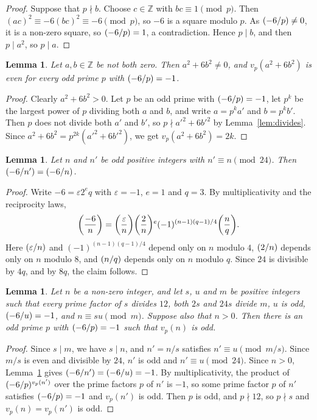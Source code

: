 \documentclass[11pt]{article}
\newtheorem{lemma}[theorem]{Lemma}
\newcommand{\Z}{\mathbb{Z}}
\newcommand{\leg}[2]{\mathchoice{\biggl(\dfrac{#1}{#2}\biggr)}{(#1/#2)}{(#1/#2)}{(#1/#2)}}
\begin{document}
\begin{proof}
Suppose that $p\nmid b$. Choose $c\in\Z$ with $bc\equiv1\pmod p$. Then $(ac)^2\equiv-6(bc)^2\equiv-6\pmod p$, so $-6$ is a square modulo $p$. As $\leg{-6}{p}\neq0$, it is a non-zero square, so $\leg{-6}{p}=1$, a contradiction. Hence $p\mid b$, and then $p\mid a^2$, so $p\mid a$.
\end{proof}

\begin{lemma}\label{lem:even}
Let $a,b\in\Z$ be not both zero. Then $a^2+6b^2\neq0$, and $v_p(a^2+6b^2)$ is even for every odd prime $p$ with $\leg{-6}{p}=-1$.
\end{lemma}

\begin{proof}
Clearly $a^2+6b^2>0$. Let $p$ be an odd prime with $\leg{-6}{p}=-1$, let $p^k$ be the largest power of $p$ dividing both $a$ and $b$, and write $a=p^ka'$ and $b=p^kb'$. Then $p$ does not divide both $a'$ and $b'$, so $p\nmid a'^2+6b'^2$ by Lemma~\ref{lem:divides}. Since $a^2+6b^2=p^{2k}(a'^2+6b'^2)$, we get $v_p(a^2+6b^2)=2k$.
\end{proof}

\begin{lemma}\label{lem:period}
Let $n$ and $n'$ be odd positive integers with $n'\equiv n\pmod{24}$. Then $\leg{-6}{n'}=\leg{-6}{n}$.
\end{lemma}

\begin{proof}
Write $-6=\varepsilon2^eq$ with $\varepsilon=-1$, $e=1$ and $q=3$. By multiplicativity and the reciprocity laws,
\[
\leg{-6}{n}=\leg{\varepsilon}{n}\leg{2}{n}^e(-1)^{(n-1)(q-1)/4}\leg{n}{q}.
\]
Here $\leg{\varepsilon}{n}$ and $(-1)^{(n-1)(q-1)/4}$ depend only on $n$ modulo $4$, $\leg{2}{n}$ depends only on $n$ modulo $8$, and $\leg{n}{q}$ depends only on $n$ modulo $q$. Since $24$ is divisible by $4q$, and by $8q$, the claim follows.
\end{proof}

\begin{lemma}\label{lem:odd}
Let $n$ be a non-zero integer, and let $s$, $u$ and $m$ be positive integers such that every prime factor of $s$ divides $12$, both $2s$ and $24s$ divide $m$, $u$ is odd, $\leg{-6}{u}=-1$, and $n\equiv su\pmod m$. Suppose also that $n>0$. Then there is an odd prime $p$ with $\leg{-6}{p}=-1$ such that $v_p(n)$ is odd.
\end{lemma}

\begin{proof}
Since $s\mid m$, we have $s\mid n$, and $n'=n/s$ satisfies $n'\equiv u\pmod{m/s}$. Since $m/s$ is even and divisible by $24$, $n'$ is odd and $n'\equiv u\pmod{24}$. Since $n>0$, Lemma~\ref{lem:period} gives $\leg{-6}{n'}=\leg{-6}{u}=-1$. By multiplicativity, the product of $\leg{-6}{p}^{v_p(n')}$ over the prime factors $p$ of $n'$ is $-1$, so some prime factor $p$ of $n'$ satisfies $\leg{-6}{p}=-1$ and $v_p(n')$ is odd. Then $p$ is odd, and $p\nmid12$, so $p\nmid s$ and $v_p(n)=v_p(n')$ is odd.
\end{proof}
\end{document}
